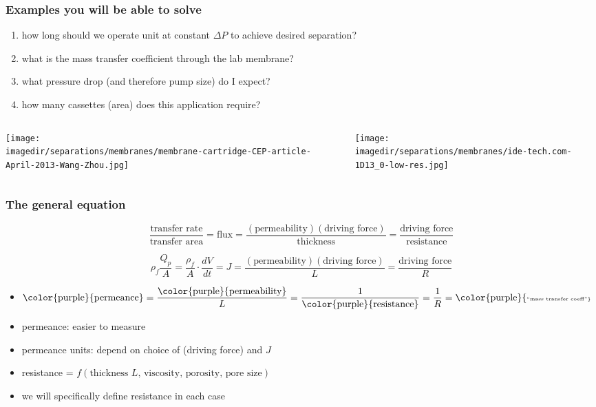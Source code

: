 \begin{frame}\frametitle{Examples you will be able to solve}
	\begin{enumerate}
		\item	how long should we operate unit at constant \( \Delta P \) to achieve desired separation?
		\item	what is the mass transfer coefficient through the lab membrane?
		\item	what pressure drop (and therefore pump size) do I expect?
		\item	how many cassettes (area) does this application require?
	\end{enumerate}
	
	\begin{columns}[t]
			\begin{center}
				\texttt{[image: \\imagedir/separations/membranes/membrane-cartridge-CEP-article-April-2013-Wang-Zhou.jpg]}
			\end{center}
			
			\begin{center}
				\texttt{[image: \\imagedir/separations/membranes/ide-tech.com-1D13\_0-low-res.jpg]}
			\end{center}
	\end{columns}	
\end{frame}

\begin{frame}\frametitle{The general equation}
	\begin{exampleblock}{}
		\[
			\dfrac{\text{transfer rate}}{\text{transfer area}}  = \text{flux} = \dfrac{(\text{permeability})(\text{driving force})}{\text{thickness}} = \dfrac{\text{driving force}}{\text{resistance}}
		\]
	\end{exampleblock}


	\vfill
	{\color{myOrange}{Symbolically:}}
	\[
		 \rho_f\dfrac{Q_p}{A} = \dfrac{\rho_f}{A}\cdot\frac{dV}{dt} =  J = \dfrac{(\text{permeability})(\text{driving force})}{L} = \dfrac{\text{driving force}}{R}
	\]
	\begin{itemize}
		\item	 $\text{\color{purple}{permeance}} = \dfrac{\text{\color{purple}{permeability}}}{L} = \dfrac{1}{\text{\color{purple}{resistance}}} = \dfrac{1}{R} = \text{{\color{purple}{\tiny ``mass transfer coeff''}}}$
		\item	permeance: easier to measure
		\item	permeance units: depend on choice of (driving force) and $J$
		\item	resistance = $f(\text{thickness $L$, viscosity, porosity, pore size})$
		\item	we will specifically define resistance in each case
	\end{itemize}
\end{frame}

